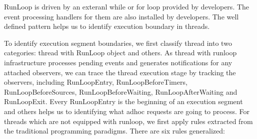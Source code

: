 RunLoop is driven by an exteranl while or for loop provided by developers.
The event processing handlers for them are also installed by developers. 
The well defined pattern helps us to identify execution boundary in threads.
\par
To identify execution segment boundaries, we first classify thread into two categories: thread with RunLoop object and others.
As thread with runloop infrastructure processes pending events and generates notifications for any attached observers, 
we can trace the thread execution stage by tracking the observers, including RunLoopEntry, RunLoopBeforeTimers, RunLoopBeforeSources, RunLoopBeforeWaiting, RunLoopAfterWaiting and RunLoopExit.
Every RunLoopEntry is the beginning of an execution segment and others helps us to identifying what adhoc requests are going to process.
For threads which are not equipped with runloop, we first apply rules extracted from the traditional programming paradigms.
There are six rules generalized:
